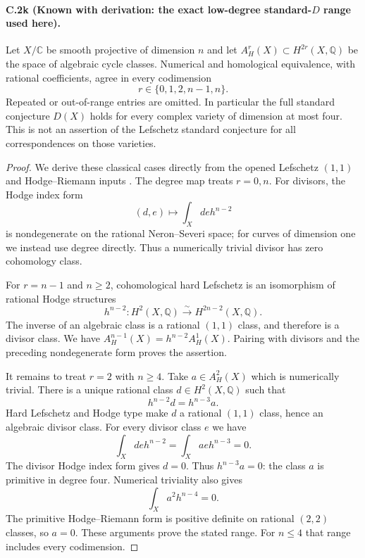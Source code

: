 \paragraph{C.2k (Known with derivation: the exact low-degree standard-$D$ range used here).}
Let $X/\mathbb C$ be smooth projective of dimension $n$ and let
$A^r_H(X)\subset H^{2r}(X,\mathbb Q)$ be the space of algebraic
cycle classes. Numerical and homological equivalence, with rational
coefficients, agree in every codimension
\[
                        r\in\{0,1,2,n-1,n\}.
\]
Repeated or out-of-range entries are omitted. In particular the
full standard conjecture $D(X)$ holds for every complex variety
of dimension at most four. This is not an assertion of the
Lefschetz standard conjecture for all correspondences on those
varieties.

\begin{proof}
We derive these classical cases directly from the opened
Lefschetz $(1,1)$ and Hodge--Riemann inputs
\citep[Remark 3.4, p.~379, and Remark 3.10, p.~380]{cyKleiman1968}.
The degree map treats $r=0,n$. For divisors, the Hodge index
form
\[
       (d,e)\longmapsto\int_X deh^{n-2}
\]
is nondegenerate on the rational Neron--Severi space; for curves
of dimension one we instead use degree directly. Thus a
numerically trivial divisor has zero cohomology class.

For $r=n-1$ and $n\ge2$, cohomological hard Lefschetz is an
isomorphism of rational Hodge structures
\[
 h^{n-2}:H^2(X,\mathbb Q)\xrightarrow{\sim}
                         H^{2n-2}(X,\mathbb Q).
\]
The inverse of an algebraic class is a rational $(1,1)$ class,
and therefore is a divisor class. We have
$A_H^{n-1}(X)=h^{n-2}A_H^1(X)$. Pairing with divisors and
the preceding nondegenerate form proves the assertion.

It remains to treat $r=2$ with $n\ge4$.
Take $a\in A_H^2(X)$ which is numerically trivial.
There is a unique rational class $d\in H^2(X,\mathbb Q)$ such
that
\[
                      h^{n-2}d=h^{n-3}a.
\]
Hard Lefschetz and Hodge type make $d$ a rational $(1,1)$
class, hence an algebraic divisor class. For every divisor
class $e$ we have
\[
             \int_X deh^{n-2}=
             \int_X aeh^{n-3}=0.
\]
The divisor Hodge index form gives $d=0$. Thus
$h^{n-3}a=0$: the class $a$ is primitive in degree four.
Numerical triviality also gives
\[
                         \int_X a^2h^{n-4}=0.
\]
The primitive Hodge--Riemann form is positive definite on
rational $(2,2)$ classes, so $a=0$. These arguments prove
the stated range. For $n\le4$ that range includes every
codimension.
\end{proof}


